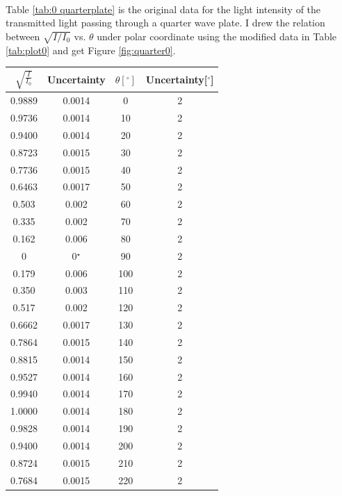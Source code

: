 \documentclass{my_template}
\begin{document}
    \paragraph{} Table \ref{tab:0 quarterplate} is the original data for the light intensity of the transmitted light passing through a quarter wave plate. I drew the relation between $\sqrt{I/I_0}$ vs. $\theta$ under polar coordinate using the modified data in Table \ref{tab:plot0} and get Figure \ref{fig:quarter0}.
    \begin{table}[!ht]
        \centering
        \begin{tabular}{|c|c|c|c|}
            \hline
            $\sqrt{\frac{I}{I_0}}$&Uncertainty&$\theta[^\circ]$&Uncertainty[$^\circ$]\\\hline
            0.9889&0.0014&0&2\\\hline
            0.9736&0.0014&10&2\\\hline
            0.9400&0.0014&20&2\\\hline
            0.8723&0.0015&30&2\\\hline
            0.7736&0.0015&40&2\\\hline
            0.6463&0.0017&50&2\\\hline
            0.503&0.002&60&2\\\hline
            0.335&0.002&70&2\\\hline
            0.162&0.006&80&2\\\hline
            0&0$^\star$&90&2\\\hline
            0.179&0.006&100&2\\\hline
            0.350&0.003&110&2\\\hline
            0.517&0.002&120&2\\\hline
            0.6662&0.0017&130&2\\\hline
            0.7864&0.0015&140&2\\\hline
            0.8815&0.0014&150&2\\\hline
            0.9527&0.0014&160&2\\\hline
            0.9940&0.0014&170&2\\\hline
            1.0000&0.0014&180&2\\\hline
            0.9828&0.0014&190&2\\\hline
            0.9400&0.0014&200&2\\\hline
            0.8724&0.0015&210&2\\\hline
            0.7684&0.0015&220&2\\\hline

\end{tabular}
\end{table}
\end{document}
